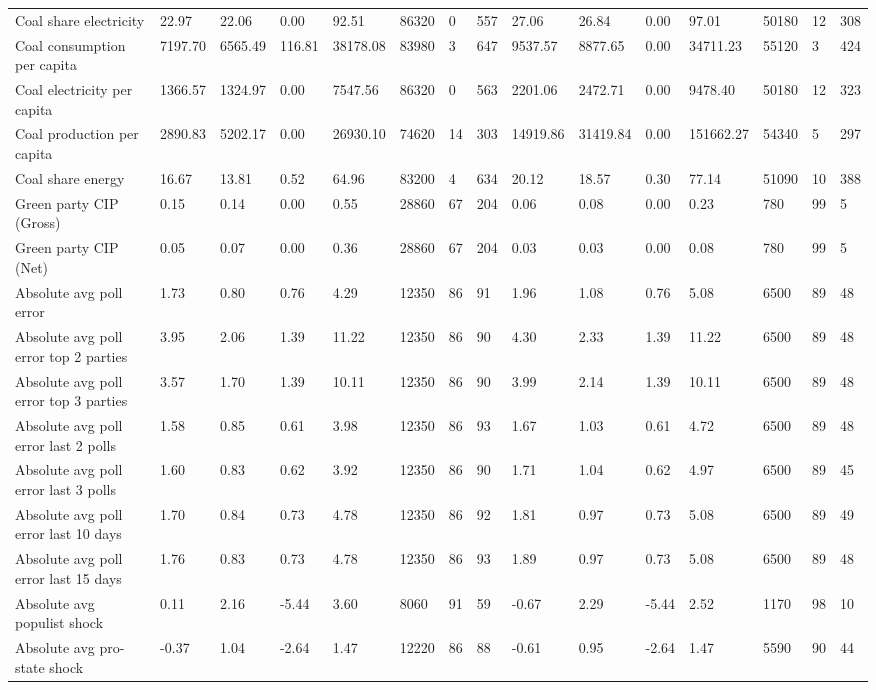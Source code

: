 \begin{longtable}{lllllllllllllll}
\addlinespace
Coal share electricity & 22.97 & 22.06 & 0.00 & 92.51 & 86320 & 0 & 557 & 27.06 & 26.84 & 0.00 & 97.01 & 50180 & 12 & 308\\
Coal consumption per capita & 7197.70 & 6565.49 & 116.81 & 38178.08 & 83980 & 3 & 647 & 9537.57 & 8877.65 & 0.00 & 34711.23 & 55120 & 3 & 424\\
Coal electricity per capita & 1366.57 & 1324.97 & 0.00 & 7547.56 & 86320 & 0 & 563 & 2201.06 & 2472.71 & 0.00 & 9478.40 & 50180 & 12 & 323\\
Coal production per capita & 2890.83 & 5202.17 & 0.00 & 26930.10 & 74620 & 14 & 303 & 14919.86 & 31419.84 & 0.00 & 151662.27 & 54340 & 5 & 297\\
Coal share energy & 16.67 & 13.81 & 0.52 & 64.96 & 83200 & 4 & 634 & 20.12 & 18.57 & 0.30 & 77.14 & 51090 & 10 & 388\\
\addlinespace
Green party CIP (Gross) & 0.15 & 0.14 & 0.00 & 0.55 & 28860 & 67 & 204 & 0.06 & 0.08 & 0.00 & 0.23 & 780 & 99 & 5\\
Green party CIP (Net) & 0.05 & 0.07 & 0.00 & 0.36 & 28860 & 67 & 204 & 0.03 & 0.03 & 0.00 & 0.08 & 780 & 99 & 5\\
Absolute avg poll error & 1.73 & 0.80 & 0.76 & 4.29 & 12350 & 86 & 91 & 1.96 & 1.08 & 0.76 & 5.08 & 6500 & 89 & 48\\
Absolute avg poll error top 2 parties & 3.95 & 2.06 & 1.39 & 11.22 & 12350 & 86 & 90 & 4.30 & 2.33 & 1.39 & 11.22 & 6500 & 89 & 48\\
Absolute avg poll error top 3 parties & 3.57 & 1.70 & 1.39 & 10.11 & 12350 & 86 & 90 & 3.99 & 2.14 & 1.39 & 10.11 & 6500 & 89 & 48\\
\addlinespace
Absolute avg poll error last 2 polls & 1.58 & 0.85 & 0.61 & 3.98 & 12350 & 86 & 93 & 1.67 & 1.03 & 0.61 & 4.72 & 6500 & 89 & 48\\
Absolute avg poll error last 3 polls & 1.60 & 0.83 & 0.62 & 3.92 & 12350 & 86 & 90 & 1.71 & 1.04 & 0.62 & 4.97 & 6500 & 89 & 45\\
Absolute avg poll error last 10 days & 1.70 & 0.84 & 0.73 & 4.78 & 12350 & 86 & 92 & 1.81 & 0.97 & 0.73 & 5.08 & 6500 & 89 & 49\\
Absolute avg poll error last 15 days & 1.76 & 0.83 & 0.73 & 4.78 & 12350 & 86 & 93 & 1.89 & 0.97 & 0.73 & 5.08 & 6500 & 89 & 48\\
Absolute avg populist shock & 0.11 & 2.16 & -5.44 & 3.60 & 8060 & 91 & 59 & -0.67 & 2.29 & -5.44 & 2.52 & 1170 & 98 & 10\\
\addlinespace
Absolute avg pro-state shock & -0.37 & 1.04 & -2.64 & 1.47 & 12220 & 86 & 88 & -0.61 & 0.95 & -2.64 & 1.47 & 5590 & 90 & 44\\

\end{longtable}
